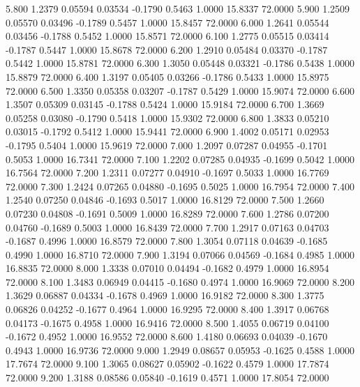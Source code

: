    5.800   1.2379   0.05594   0.03534  -0.1790   0.5463   1.0000  15.8337  72.0000
   5.900   1.2509   0.05570   0.03496  -0.1789   0.5457   1.0000  15.8457  72.0000
   6.000   1.2641   0.05544   0.03456  -0.1788   0.5452   1.0000  15.8571  72.0000
   6.100   1.2775   0.05515   0.03414  -0.1787   0.5447   1.0000  15.8678  72.0000
   6.200   1.2910   0.05484   0.03370  -0.1787   0.5442   1.0000  15.8781  72.0000
   6.300   1.3050   0.05448   0.03321  -0.1786   0.5438   1.0000  15.8879  72.0000
   6.400   1.3197   0.05405   0.03266  -0.1786   0.5433   1.0000  15.8975  72.0000
   6.500   1.3350   0.05358   0.03207  -0.1787   0.5429   1.0000  15.9074  72.0000
   6.600   1.3507   0.05309   0.03145  -0.1788   0.5424   1.0000  15.9184  72.0000
   6.700   1.3669   0.05258   0.03080  -0.1790   0.5418   1.0000  15.9302  72.0000
   6.800   1.3833   0.05210   0.03015  -0.1792   0.5412   1.0000  15.9441  72.0000
   6.900   1.4002   0.05171   0.02953  -0.1795   0.5404   1.0000  15.9619  72.0000
   7.000   1.2097   0.07287   0.04955  -0.1701   0.5053   1.0000  16.7341  72.0000
   7.100   1.2202   0.07285   0.04935  -0.1699   0.5042   1.0000  16.7564  72.0000
   7.200   1.2311   0.07277   0.04910  -0.1697   0.5033   1.0000  16.7769  72.0000
   7.300   1.2424   0.07265   0.04880  -0.1695   0.5025   1.0000  16.7954  72.0000
   7.400   1.2540   0.07250   0.04846  -0.1693   0.5017   1.0000  16.8129  72.0000
   7.500   1.2660   0.07230   0.04808  -0.1691   0.5009   1.0000  16.8289  72.0000
   7.600   1.2786   0.07200   0.04760  -0.1689   0.5003   1.0000  16.8439  72.0000
   7.700   1.2917   0.07163   0.04703  -0.1687   0.4996   1.0000  16.8579  72.0000
   7.800   1.3054   0.07118   0.04639  -0.1685   0.4990   1.0000  16.8710  72.0000
   7.900   1.3194   0.07066   0.04569  -0.1684   0.4985   1.0000  16.8835  72.0000
   8.000   1.3338   0.07010   0.04494  -0.1682   0.4979   1.0000  16.8954  72.0000
   8.100   1.3483   0.06949   0.04415  -0.1680   0.4974   1.0000  16.9069  72.0000
   8.200   1.3629   0.06887   0.04334  -0.1678   0.4969   1.0000  16.9182  72.0000
   8.300   1.3775   0.06826   0.04252  -0.1677   0.4964   1.0000  16.9295  72.0000
   8.400   1.3917   0.06768   0.04173  -0.1675   0.4958   1.0000  16.9416  72.0000
   8.500   1.4055   0.06719   0.04100  -0.1672   0.4952   1.0000  16.9552  72.0000
   8.600   1.4180   0.06693   0.04039  -0.1670   0.4943   1.0000  16.9736  72.0000
   9.000   1.2949   0.08657   0.05953  -0.1625   0.4588   1.0000  17.7674  72.0000
   9.100   1.3065   0.08627   0.05902  -0.1622   0.4579   1.0000  17.7874  72.0000
   9.200   1.3188   0.08586   0.05840  -0.1619   0.4571   1.0000  17.8054  72.0000
